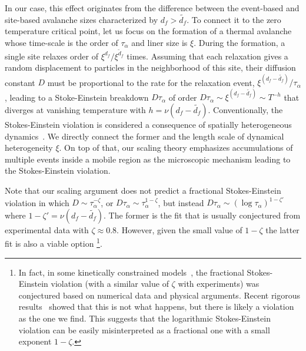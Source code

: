 \documentclass[pre,twocolumn,superscriptaddress,tightenlines,showpacs,longbibliography,floatfix,footinbib]{revtex4-1}
\begin{document}
In our case, this effect originates from the difference between the event-based and site-based avalanche sizes characterized by $d_f>\tilde{d_f}$. To connect it to the zero temperature critical point, let us focus on the formation of a thermal avalanche whose time-scale is the order of $\tau_\alpha$ and liner size is $\xi$. %
During the formation, 
a single site relaxes order of $\xi^{d_f}/\xi^{\tilde d_f}$ times. Assuming that each relaxation gives a random displacement to particles in the neighborhood of this site, their diffusion constant $D$ must be proportional to the rate for the relaxation event, $\xi^{(d_f-\tilde{d_f})}/\tau_\alpha$, leading to a Stoke-Einstein breakdown $D \tau_\alpha$ of order $D \tau_\alpha\sim \xi^{(d_f-\tilde{d_f})}\sim T^{-h}$ that diverges at vanishing temperature with $h=\nu(d_f-\tilde{d_f})$. 
Conventionally, the Stokes-Einstein violation is considered a consequence of spatially heterogeneous dynamics~\cite{ediger2000spatially}. We directly connect the former and the length scale of dynamical heterogeneity $\xi$. On top of that, our scaling theory emphasizes accumulations of multiple events inside a mobile region as the microscopic mechanism leading to the Stokes-Einstein violation. 

Note that our scaling argument does not predict a fractional Stokes-Einstein violation in which $D \sim \tau_\alpha^{-\zeta}$, or $D \tau_\alpha \sim \tau_\alpha^{1-\zeta}$,  but instead $D\tau_\alpha \sim (\log \tau_\alpha)^{1-\zeta'}$ where $1-\zeta'=\nu(d_f-\tilde{d_f})$. The former is the fit that is usually conjectured from experimental data \cite{swallen2003self,mallamace2010transport} with $\zeta \approx 0.8$. However, given the small value of $1-\zeta$ the latter fit is also a viable option 
\footnote{In fact, in some kinetically constrained models~\cite{garrahan2011kinetically}, the fractional Stokes-Einstein violation (with a similar value of $\zeta$ with experiments) was conjectured based on numerical data and physical arguments. Recent rigorous results~\cite{blondel2014there} showed that this is not what happens, but there is likely a violation as the one we find. This suggests that the logarithmic Stokes-Einstein violation can be easily misinterpreted as a fractional one with a small exponent $1-\zeta$.}. 
\end{document}
